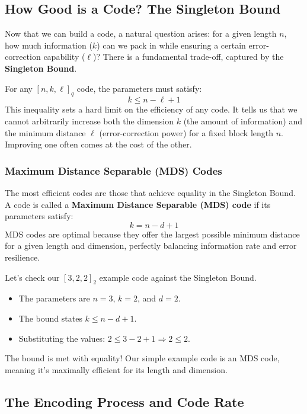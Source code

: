\documentclass{article}
\begin{document}
\subsection{How Good is a Code? The Singleton Bound}

Now that we can build a code, a natural question arises: for a given length $n$, how much information ($k$) can we pack in while ensuring a certain error-correction capability ($\ell$)? There is a fundamental trade-off, captured by the \textbf{Singleton Bound}.

For any $[n, k, \ell]_q$ code, the parameters must satisfy:
\[
k \leq n - \ell + 1
\]
This inequality sets a hard limit on the efficiency of any code. It tells us that we cannot arbitrarily increase both the dimension $k$ (the amount of information) and the minimum distance $\ell$ (error-correction power) for a fixed block length $n$. Improving one often comes at the cost of the other.

\subsubsection{Maximum Distance Separable (MDS) Codes}

The most efficient codes are those that achieve equality in the Singleton Bound. A code is called a \textbf{Maximum Distance Separable (MDS) code} if its parameters satisfy:
\[
k = n - d + 1
\]
MDS codes are optimal because they offer the largest possible minimum distance for a given length and dimension, perfectly balancing information rate and error resilience.

\begin{tcolorbox}[title={Example: Checking for MDS Property}]
Let's check our $[3, 2, 2]_2$ example code against the Singleton Bound.
\begin{itemize}
    \item The parameters are $n=3$, $k=2$, and $d=2$.
    \item The bound states $k \leq n - d + 1$.
    \item Substituting the values: $2 \leq 3 - 2 + 1 \Rightarrow 2 \leq 2$.
\end{itemize}
The bound is met with equality! Our simple example code is an MDS code, meaning it's maximally efficient for its length and dimension.
\end{tcolorbox}



\subsection{The Encoding Process and Code Rate}
\end{document}
